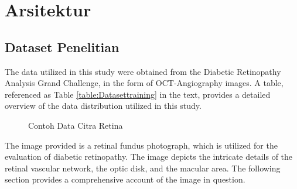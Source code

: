 \section{Arsitektur}
\label{sec:architecture}


\subsection{Dataset Penelitian}
\label{subsec:dataset}

The data utilized in this study were obtained from the Diabetic Retinopathy Analysis Grand Challenge, in the form of OCT-Angiography images.
A table, referenced as Table \ref{table:Datasettraining} in the text, provides a detailed overview of the data distribution utilized in this study.
\begin{figure}[hbtp]
	\centering
	\caption{Contoh Data Citra Retina}
	\label{fig:sampleDataset}
\end{figure}

The image provided is a retinal fundus photograph, which is utilized for the evaluation of diabetic retinopathy. The image depicts the intricate details of the retinal vascular network, the optic disk, and the macular area. The following section provides a comprehensive account of the image in question.

